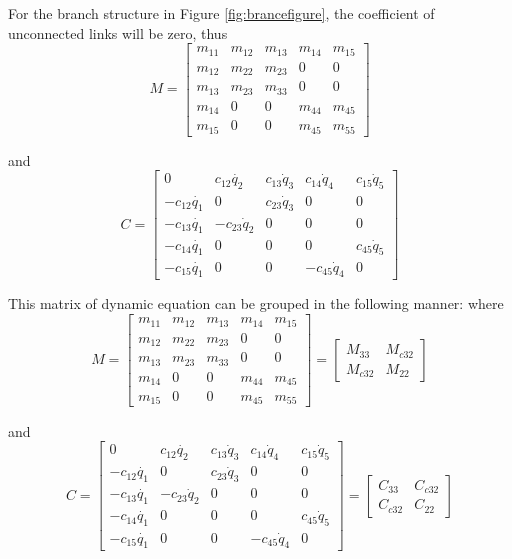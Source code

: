 For the branch structure in Figure \ref{fig:brancefigure},
the coefficient of unconnected links will be zero, thus
\[
M=\left[\begin{array}{ccccc}
m_{11} & m_{12} & m_{13} & m_{14} & m_{15}\\
m_{12} & m_{22} & m_{23} & 0 & 0\\
m_{13} & m_{23} & m_{33} & 0 & 0\\
m_{14} & 0 & 0 & m_{44} & m_{45}\\
m_{15} & 0 & 0 & m_{45} & m_{55}\end{array}\right]
\]

and
\[
C=\left[\begin{array}{ccccc}
0 & c_{12}\dot{q_{2}} & c_{13}\dot{q}_{3} & c_{14}\dot{q}_{4} & c_{15}\dot{q}_{5}\\
-c_{12}\dot{q_{1}} & 0 & c_{23}\dot{q}_{3} & 0 & 0\\
-c_{13}\dot{q_{1}} & -c_{23}\dot{q}_{2} & 0 & 0 & 0\\
-c_{14}\dot{q_{1}} & 0 & 0 & 0 & c_{45}\dot{q}_{5}\\
-c_{15}\dot{q_{1}} & 0 & 0 & -c_{45}\dot{q}_{4} & 0\end{array}\right]
\]








This matrix of dynamic equation can be grouped in the following manner:
where
\[
M=\left[\begin{array}{ccc|cc}
m_{11} & m_{12} & m_{13} & m_{14} & m_{15}\\
m_{12} & m_{22} & m_{23} & 0 & 0\\
m_{13} & m_{23} & m_{33} & 0 & 0\\ \hline
m_{14} & 0 & 0 & m_{44} & m_{45}\\
m_{15} & 0 & 0 & m_{45} & m_{55}\end{array}\right]
=\left[\begin{array}{cc}
M_{33} & M_{c32}\\
M_{c32} & M_{22}\end{array}\right]
\]

and
\[
C=
\left[\begin{array}{ccc|cc}
0 & c_{12}\dot{q_{2}} & c_{13}\dot{q}_{3} & c_{14}\dot{q}_{4} & c_{15}\dot{q}_{5}\\
-c_{12}\dot{q_{1}} & 0 & c_{23}\dot{q}_{3} & 0 & 0\\
-c_{13}\dot{q_{1}} & -c_{23}\dot{q}_{2} & 0 & 0 & 0\\ \hline
-c_{14}\dot{q_{1}} & 0 & 0 & 0 & c_{45}\dot{q}_{5}\\
-c_{15}\dot{q_{1}} & 0 & 0 & -c_{45}\dot{q}_{4} & 0\end{array}\right]
=\left[\begin{array}{cc}
C_{33} & C_{c32}\\
C_{c32} & C_{22}\end{array}\right]
\]

